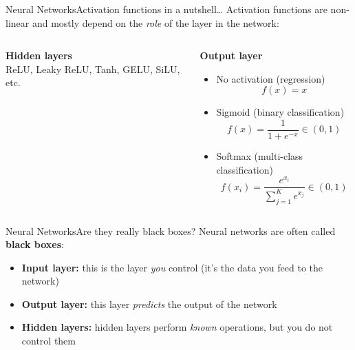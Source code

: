 \begin{frame}{Neural Networks}{Activation functions in a nutshell\dots}
    Activation functions are non-linear and mostly depend on the \emph{role} of the layer in the network:

    \vfill

    \begin{columns}[T]
        \begin{column}{0.5\textwidth}
            \centering
            {\large \textbf{Hidden layers}} \\[1em]

            \alert<2>{ReLU},
            \alert<3>{Leaky ReLU},
            \alert<4>{Tanh},
            \alert<5>{GELU},
            \alert<6>{SiLU}, etc. \\[1em]

            
        \end{column}
        \hfil
        \begin{column}{0.5\textwidth}
            \centering
            {\large \textbf{Output layer}} \\[1em]

            \begin{itemize}
                \item<8-> No activation (regression) $$f(x) = x$$
                \item<9-> Sigmoid (binary classification) $$f(x) = \frac{1}{1 + e^{-x}} \in (0, 1)$$
                \item<10-> Softmax (multi-class classification) $$f(x_i) = \frac{e^{x_i}}{\sum_{j=1}^{K} e^{x_j}} \in (0, 1)$$
            \end{itemize}

        \end{column}
    \end{columns}
\end{frame}

\begin{frame}{Neural Networks}{Are they really black boxes?}
    Neural networks are often called \textbf{black boxes}:

    \vfill

    \begin{center}
        
    \end{center}

    \begin{itemize}
        \item<2-> \textbf{Input layer:} this is the layer \emph{you} control (it's the data you feed to the network)
        \item<3-> \textbf{Output layer:} this layer \emph{predicts} the output of the network
        \item<4-> \textbf{Hidden layers:} hidden layers perform \emph{known} operations, but you do not control them
    \end{itemize}
\end{frame}


